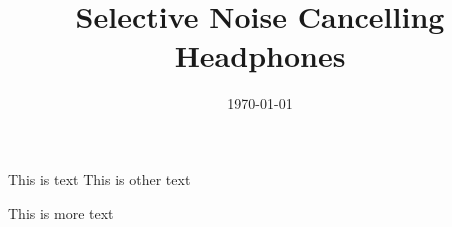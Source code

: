 \documentclass{ecsproject}
\title{Selective Noise Cancelling Headphones}
\date{\today}
\begin{document}
\maketitle

This is text \cite{EMHeadsets}
This is other text \cite{EMNoiseCancel}

This is more \cite{ICAAlg&Apps} text



\end{document}
